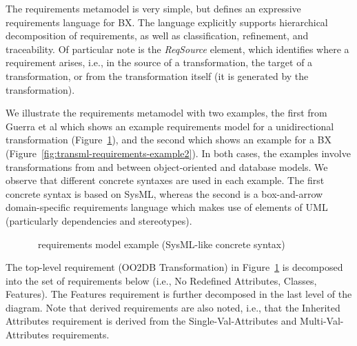 The requirements metamodel is very simple, but defines an expressive requirements language for BX. The language explicitly supports hierarchical decomposition of requirements, as well as classification, refinement, and traceability. Of particular note is the \textit{ReqSource} element, which identifies where a requirement arises, i.e., in the source of a transformation, the target of a transformation, or from the transformation itself (it is generated by the transformation). 

We illustrate the requirements metamodel with two examples, the first from Guerra et al \cite{GuerraLKPS13} which shows an example requirements model for a unidirectional transformation (Figure~\ref{fig:transml-requirements-example1}), and the second which shows an example for a BX (Figure~\ref{fig:transml-requirements-example2}). In both cases, the examples involve transformations from and between object-oriented and database models. We observe that different concrete syntaxes are used in each example. The first concrete syntax is based on SysML, whereas the second is a box-and-arrow domain-specific requirements language which makes use of elements of UML (particularly dependencies and stereotypes).

\begin{figure}[htbp]
\caption{\transml\ requirements model example (SysML-like concrete syntax)}
\label{fig:transml-requirements-example1}
\end{figure}

The top-level requirement (OO2DB Transformation) in Figure~\ref{fig:transml-requirements-example1} is decomposed into the set of requirements below (i.e., No Redefined Attributes, Classes, Features). The Features requirement is further decomposed in the last level of the diagram. Note that derived requirements are also noted, i.e., that the Inherited Attributes requirement is derived from the Single-Val-Attributes and Multi-Val-Attributes requirements.

